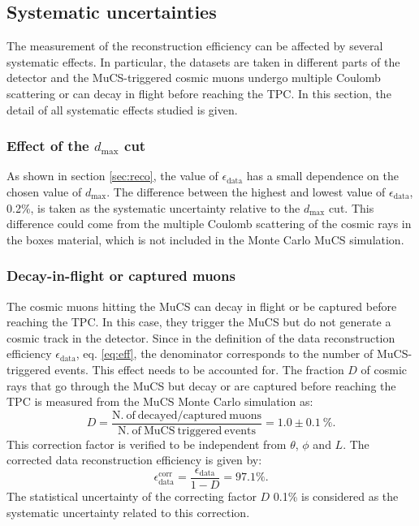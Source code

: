 \documentclass[a4paper,11pt]{article}
\begin{document}
\subsection{Systematic uncertainties}\label{sec:sys}
The measurement of the reconstruction efficiency can be affected by several systematic effects. In particular, the datasets are taken in different parts of the detector and the MuCS-triggered cosmic muons undergo multiple Coulomb scattering or can decay in flight before reaching the TPC. In this section, the detail of all systematic effects studied is given.

\subsubsection{Effect of the $d_{\mathrm{max}}$ cut}

As shown in section \ref{sec:reco}, the value of $\epsilon_{\mathrm{data}}$ has a small dependence on the chosen value of $d_{\mathrm{max}}$. The difference between the highest and lowest value of $\epsilon_{\mathrm{data}}$, 0.2\%, is taken as the systematic uncertainty relative to the $d_{\mathrm{max}}$ cut. This difference could come from the multiple Coulomb scattering of the cosmic rays in the boxes material, which is not included in the Monte Carlo MuCS simulation.


\subsubsection{Decay-in-flight or captured muons}\label{sec:dif}
The cosmic muons hitting the MuCS can decay in flight or be captured before reaching the TPC. In this case, they trigger the MuCS but do not generate a cosmic track in the detector. Since in the definition of the data reconstruction efficiency $\epsilon_{\mathrm{data}}$, eq. \eqref{eq:eff}, the denominator corresponds to the number of MuCS-triggered events. This effect needs to be accounted for. The fraction $D$ of cosmic rays that go through the MuCS but decay or are captured before reaching the TPC is measured from the MuCS Monte Carlo simulation as:
\begin{equation}
D = \frac{\mathrm{N.~of~decayed/captured~muons}}{\mathrm{N.~of~MuCS~triggered~events}} = 1.0 \pm 0.1~\%.
\end{equation}
This correction factor is verified to be independent from $\theta$, $\phi$ and $L$. The corrected data reconstruction efficiency is given by:
\begin{equation}
\epsilon_{\mathrm{data}}^{\mathrm{corr}} =  \frac{\epsilon_{\mathrm{data}}}{1-D} = 97.1\%.
\end{equation}
The statistical uncertainty of the correcting factor $D$ 0.1\% is considered as the systematic uncertainty related to this correction.
\end{document}
